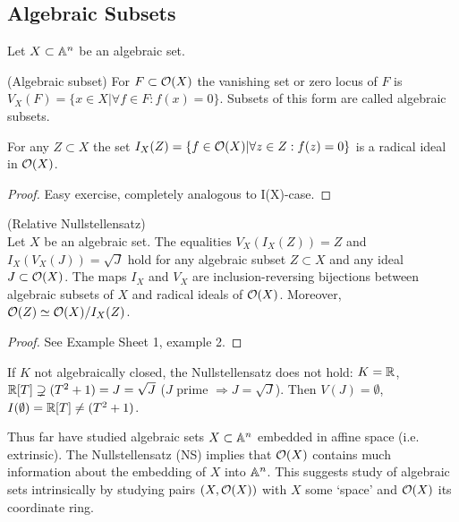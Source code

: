 \documentclass[a4paper,11pt]{article}
\begin{document}
		\subsection{Algebraic Subsets}

			Let $X\subset\AA^n$ be an algebraic set.

			\begin{defi}
				(Algebraic subset) For $F\subset\O(X)$ the vanishing set or zero locus of $F$ is $V_X(F)=\{x\in X|\forall f\in F:f(x)=0\}$. Subsets of this form are called algebraic subsets.
			\end{defi}

			\begin{prop}
				For any $Z\subset X$ the set $I_X(Z)=\{f\in\O(X)|\forall z\in Z:f(z)=0\}$ is a radical ideal in $\O(X)$.
			\end{prop}
			\begin{proof}\renewcommand{\qedsymbol}{}
				Easy exercise, completely analogous to I(X)-case.
			\end{proof}\renewcommand{\qedsymbol}{$\square$}

			\begin{thm}
				(Relative Nullstellensatz)\\Let $X$ be an algebraic set. The equalities $V_X(I_X(Z))=Z$ and $I_X(V_X(J))=\sqrt{J}$ hold for any algebraic subset $Z\subset X$ and any ideal $J\subset\O(X)$. The maps $I_X$ and $V_X$ are inclusion-reversing bijections between algebraic subsets of $X$ and radical ideals of $\O(X)$. Moreover, $\O(Z)\simeq\O(X)/I_X(Z)$.
			\end{thm}
			\begin{proof}
				See Example Sheet 1, example 2.
			\end{proof}

			\begin{remark}
				If $K$ not algebraically closed, the Nullstellensatz does not hold: $K=\R$, $\R[T]\supsetneq(T^2+1)=J=\sqrt{J}$ ($J$ prime $\Longrightarrow J=\sqrt{J}$). Then $V(J)=\emptyset$, $I(\emptyset)=\R[T]\neq(T^2+1)$.
			\end{remark}

			\begin{remark}
				Thus far have studied algebraic sets $X\subset\AA^n$ embedded in affine space (i.e. extrinsic). The Nullstellensatz (NS) implies that $\O(X)$ contains much information about the embedding of $X$ into $\AA^n$. This suggests study of algebraic sets intrinsically by studying pairs $(X,\O(X))$ with $X$ some `space' and $\O(X)$ its coordinate ring.
			\end{remark}
\end{document}
